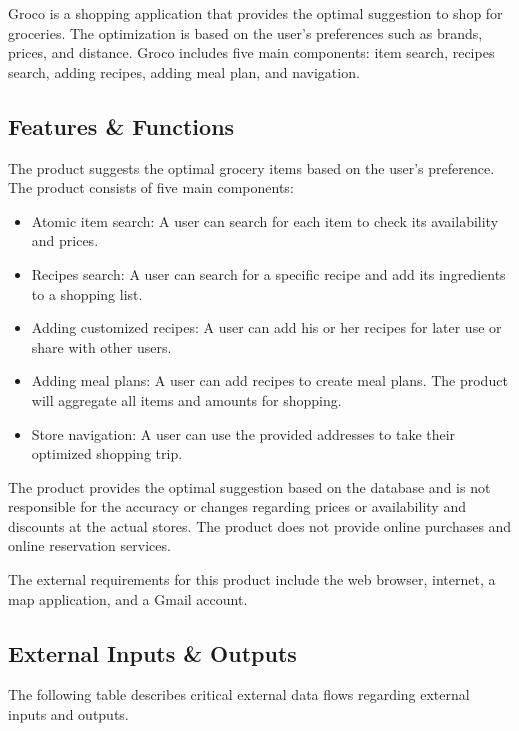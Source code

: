 Groco is a shopping application that provides the optimal suggestion to shop for groceries. The optimization is based on the user's preferences such as brands, prices, and distance. Groco includes five main components: item search, recipes search, adding recipes, adding meal plan, and navigation.

\subsection{Features \& Functions}
The product suggests the optimal grocery items based on the user's preference. The product consists of five main components:
\begin{itemize}
    \item Atomic item search: A user can search for each item to check its availability and prices.
    \item Recipes search: A user can search for a specific recipe and add its ingredients to a shopping list.
    \item Adding customized recipes: A user can add his or her recipes for later use or share with other users.
    \item Adding meal plans: A user can add recipes to create meal plans. The product will aggregate all items and amounts for shopping.
    \item Store navigation: A user can use the provided addresses to take their optimized shopping trip.
\end{itemize}
The product provides the optimal suggestion based on the database and is not responsible for the accuracy or changes regarding prices or availability and discounts at the actual stores. The product does not provide online purchases and online reservation services.

The external requirements for this product include the web browser, internet, a map application, and a Gmail account.

\subsection{External Inputs \& Outputs}
The following table describes critical external data flows regarding external inputs and outputs.

